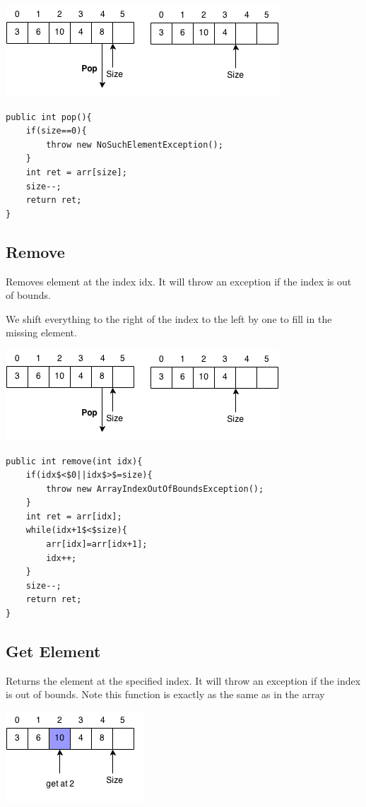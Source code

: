 \documentclass[11pt,oneside]{book}
\makeatletter
\def\maxwidth#1{\ifdim\Gin@nat@width>#1 #1\else\Gin@nat@width\fi}
\makeatother
\begin{document}
\includegraphics[width=\maxwidth{\textwidth}]{vector4.png}

\begin{lstlisting}
public int pop(){
    if(size==0){
        throw new NoSuchElementException();
    }
    int ret = arr[size];
    size--;
    return ret;
}
\end{lstlisting}

\subsection{Remove}

Removes element at the index idx. It will throw an exception if the index is out of bounds.

We shift everything to the right of the index to the left by one to fill in the missing element.

\includegraphics[width=\maxwidth{\textwidth}]{vector4.png}

\begin{lstlisting}
public int remove(int idx){
    if(idx$<$0||idx$>$=size){
        throw new ArrayIndexOutOfBoundsException();
    }
    int ret = arr[idx];
    while(idx+1$<$size){
        arr[idx]=arr[idx+1];
        idx++;
    }
    size--;
    return ret;
}
\end{lstlisting}

\subsection{Get Element}

Returns the element at the specified index. It will throw an exception if the index is out of bounds. Note this function is exactly as the same as in the array

\includegraphics[width=\maxwidth{\textwidth}]{vectorget.png}
\end{document}
